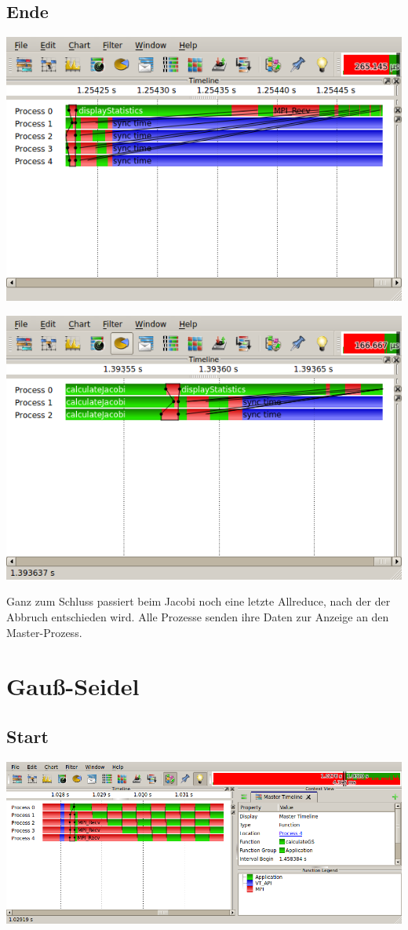 \documentclass[a4paper]{article}
\begin{document}
\subsection{Ende}
\includegraphics[scale=0.9]{img/ja_5_4_end.png}

\includegraphics[scale=0.9]{img/ja_3_2_end.png}

Ganz zum Schluss passiert beim Jacobi noch eine letzte Allreduce, nach der der Abbruch entschieden wird. Alle Prozesse senden ihre Daten zur Anzeige an den Master-Prozess.
\section{Gauß-Seidel}
\subsection{Start}
\includegraphics[scale=0.85]{img/gs_5_4_start.png}
\end{document}
